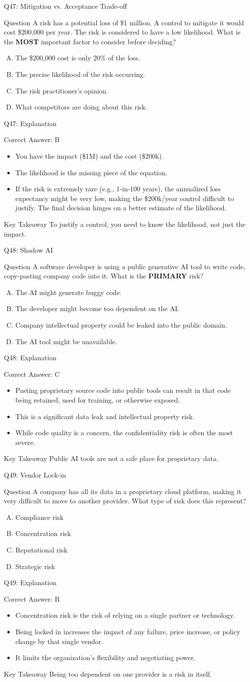 \documentclass[aspectratio=169]{beamer}
\newcommand{\hq}[7]{%
	\begin{frame}{Q#1: #2}
		\begin{block}{Question}
			#3
		\end{block}
		\begin{enumerate}[(A)]
			#4
		\end{enumerate}
	\end{frame}
	\begin{frame}{Q#1: Explanation}
		\begin{block}{Correct Answer: #5}
			\begin{itemize}
				#6
			\end{itemize}
		\end{block}
		\begin{alertblock}{Key Takeaway}
			#7
		\end{alertblock}
	\end{frame}
}
\begin{document}
	\hq{47}{Mitigation vs. Acceptance Trade-off}
	{A risk has a potential loss of \$1 million. A control to mitigate it would cost \$200,000 per year. The risk is considered to have a low likelihood. What is the \textbf{MOST} important factor to consider before deciding?}
	{\item The \$200,000 cost is only 20\% of the loss.
		\item The precise likelihood of the risk occurring.
		\item The risk practitioner's opinion.
		\item What competitors are doing about this risk.}
	{B}
	{\item You have the impact (\$1M) and the cost (\$200k).
		\item The likelihood is the missing piece of the equation.
		\item If the risk is extremely rare (e.g., 1-in-100 years), the annualized loss expectancy might be very low, making the \$200k/year control difficult to justify. The final decision hinges on a better estimate of the likelihood.}
	{To justify a control, you need to know the likelihood, not just the impact.}
	
	\hq{48}{Shadow AI}
	{A software developer is using a public generative AI tool to write code, copy-pasting company code into it. What is the \textbf{PRIMARY} risk?}
	{\item The AI might generate buggy code.
		\item The developer might become too dependent on the AI.
		\item Company intellectual property could be leaked into the public domain.
		\item The AI tool might be unavailable.}
	{C}
	{\item Pasting proprietary source code into public tools can result in that code being retained, used for training, or otherwise exposed.
		\item This is a significant data leak and intellectual property risk.
		\item While code quality is a concern, the confidentiality risk is often the most severe.}
	{Public AI tools are not a safe place for proprietary data.}
	
	\hq{49}{Vendor Lock-in}
	{A company has all its data in a proprietary cloud platform, making it very difficult to move to another provider. What type of risk does this represent?}
	{\item Compliance risk
		\item Concentration risk
		\item Reputational risk
		\item Strategic risk}
	{B}
	{\item Concentration risk is the risk of relying on a single partner or technology.
		\item Being locked in increases the impact of any failure, price increase, or policy change by that single vendor.
		\item It limits the organization's flexibility and negotiating power.}
	{Being too dependent on one provider is a risk in itself.}
	
\end{document}

